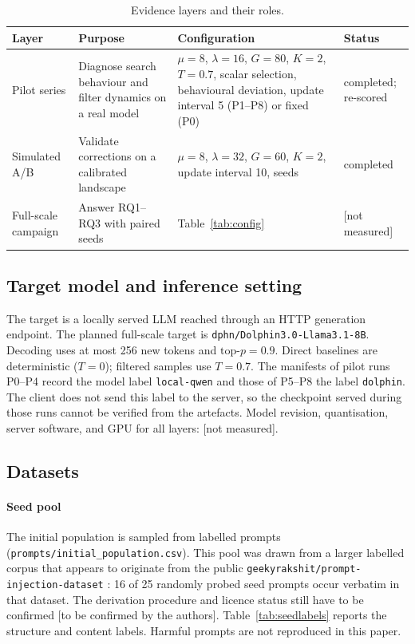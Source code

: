 \documentclass[preprint,12pt,authoryear]{elsarticle}
\newcommand{\nm}{[not measured]}
\begin{document}
\begin{table}[t]
\centering
\caption{Evidence layers and their roles.}
\label{tab:studies}
\footnotesize
\begin{tabularx}{\linewidth}{@{}lXXl@{}}
\toprule
Layer & Purpose & Configuration & Status \\
\midrule
Pilot series & Diagnose search behaviour and filter dynamics on a real model & $\mu{=}8$, $\lambda{=}16$, $G{=}80$, $K{=}2$, $T{=}0.7$, scalar selection, behavioural deviation, update interval 5 (P1--P8) or fixed (P0) & completed; re-scored \\
Simulated A/B & Validate corrections on a calibrated landscape & $\mu{=}8$, $\lambda{=}32$, $G{=}60$, $K{=}2$, update interval 10, \abSeeds{} seeds & completed \\
Full-scale campaign & Answer RQ1--RQ3 with paired seeds & Table~\ref{tab:config} & \nm \\
\bottomrule
\end{tabularx}
\end{table}

\subsection{Target model and inference setting}
The target is a locally served LLM reached through an HTTP generation endpoint. The planned full-scale target is \texttt{dphn/Dolphin3.0-Llama3.1-8B}. Decoding uses at most 256 new tokens and $\text{top-}p=0.9$. Direct baselines are deterministic ($T=0$); filtered samples use $T=0.7$. The manifests of pilot runs P0--P4 record the model label \texttt{local-qwen} and those of P5--P8 the label \texttt{dolphin}. The client does not send this label to the server, so the checkpoint served during those runs cannot be verified from the artefacts. Model revision, quantisation, server software, and GPU for all layers: \nm.

\subsection{Datasets}
\paragraph{Seed pool} The initial population is sampled from \seedPoolSize{} labelled prompts (\texttt{prompts/initial\_population.csv}). This pool was drawn from a larger labelled corpus that appears to originate from the public \texttt{geekyrakshit/prompt-injection-dataset} \citep{geekyrakshit2024dataset}: 16 of 25 randomly probed seed prompts occur verbatim in that dataset. The derivation procedure and licence status still have to be confirmed [to be confirmed by the authors]. Table~\ref{tab:seedlabels} reports the structure and content labels. Harmful prompts are not reproduced in this paper.
\end{document}
